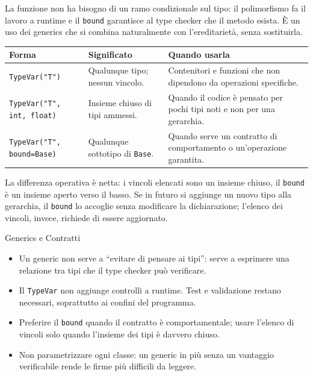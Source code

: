 \documentclass[12pt]{extarticle}
\begin{document}
\noindent La funzione non ha bisogno di un ramo condizionale sul tipo: il polimorfismo fa il lavoro a runtime e il \texttt{bound} garantisce al type checker che il metodo esista. È un uso dei generics che si combina naturalmente con l'ereditarietà, senza sostituirla.

\begin{center}
\small
\begin{tabular}{p{3.4cm}p{5.8cm}p{6.4cm}}
    \toprule
    \textbf{Forma} & \textbf{Significato} & \textbf{Quando usarla} \\
    \midrule
    \texttt{TypeVar("T")} & Qualunque tipo; nessun vincolo. & Contenitori e funzioni che non dipendono da operazioni specifiche. \\
    \addlinespace
    \texttt{TypeVar("T", int, float)} & Insieme chiuso di tipi ammessi. & Quando il codice è pensato per pochi tipi noti e non per una gerarchia. \\
    \addlinespace
    \texttt{TypeVar("T", bound=Base)} & Qualunque sottotipo di \texttt{Base}. & Quando serve un contratto di comportamento o un'operazione garantita. \\
    \bottomrule
\end{tabular}
\end{center}

\noindent La differenza operativa è netta: i vincoli elencati sono un insieme chiuso, il \texttt{bound} è un insieme aperto verso il basso. Se in futuro si aggiunge un nuovo tipo alla gerarchia, il \texttt{bound} lo accoglie senza modificare la dichiarazione; l'elenco dei vincoli, invece, richiede di essere aggiornato.

\begin{cbox}{Generics e Contratti}
\begin{itemize}
    \item Un generic non serve a ``evitare di pensare ai tipi'': serve a esprimere una relazione tra tipi che il type checker può verificare.
    \item Il \texttt{TypeVar} non aggiunge controlli a runtime. Test e validazione restano necessari, soprattutto ai confini del programma.
    \item Preferire il \texttt{bound} quando il contratto è comportamentale; usare l'elenco di vincoli solo quando l'insieme dei tipi è davvero chiuso.
    \item Non parametrizzare ogni classe: un generic in più senza un vantaggio verificabile rende le firme più difficili da leggere.
\end{itemize}
\end{cbox}
\end{document}
